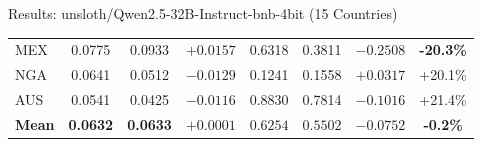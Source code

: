 \documentclass[11pt, aspectratio=169]{beamer}
\begin{document}
\begin{frame}{Results: unsloth/Qwen2.5-32B-Instruct-bnb-4bit (15 Countries)}
\begin{table}
\begin{tabular}{@{}l cc c cc c c@{}}
\rowcolor{lightgray}
MEX & 0.0775 & 0.0933 & \textcolor{alertred}{$+0.0157$} & 0.6318 & 0.3811 & \textcolor{alertred}{$-0.2508$} & \textcolor{alertred}{\textbf{-20.3\%}} \\
NGA & 0.0641 & 0.0512 & $-0.0129$ & 0.1241 & 0.1558 & $+0.0317$ & \textcolor{cbGreen}{+20.1\%} \\
AUS & 0.0541 & 0.0425 & $-0.0116$ & 0.8830 & 0.7814 & \textcolor{alertred}{$-0.1016$} & \textcolor{cbGreen}{+21.4\%} \\
\midrule
\textbf{Mean} & \textbf{0.0632} & \textbf{0.0633} & \textcolor{alertred}{$\mathbf{+0.0001}$} & $\mathbf{0.6254}$ & $\mathbf{0.5502}$ & \textcolor{alertred}{$\mathbf{-0.0752}$} & \textcolor{alertred}{\textbf{-0.2\%}} \\
\bottomrule
\end{tabular}
\end{table}

\end{frame}
\end{document}
